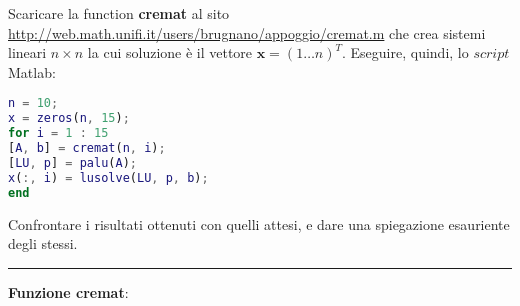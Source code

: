 Scaricare la function \textbf{cremat} al sito
\url{http://web.math.unifi.it/users/brugnano/appoggio/cremat.m}
che crea sistemi lineari $n \times n$ la cui soluzione è il vettore $\textbf{x}=(1 \dots n)^{T}$.
Eseguire, quindi, lo $script$ Matlab:
\begin{lstlisting}[language=Matlab]
n = 10;
x = zeros(n, 15);
for i = 1 : 15
[A, b] = cremat(n, i);
[LU, p] = palu(A);
x(:, i) = lusolve(LU, p, b);
end
\end{lstlisting}
Confrontare i risultati ottenuti con quelli attesi, e dare una spiegazione esauriente degli stessi.

\hspace*{\fill}
\par\noindent\rule{\textwidth}{0.4pt}
\hspace*{\fill}

\textbf{Funzione cremat}:


